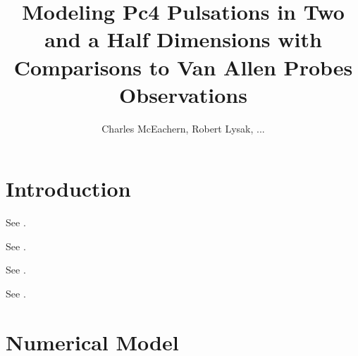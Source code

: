\documentclass[jgrga]{agutex}
\begin{document}
\title{Modeling Pc4 Pulsations in Two and a Half Dimensions with
       Comparisons to Van Allen Probes Observations}
\author{Charles McEachern, Robert Lysak, ...}


\linespread{2}


\begin{abstract}

\lipsum[1]

\end{abstract}

\begin{article}


\section{Introduction}

See \cite{dai_2015}. 

See \cite{lysak_2004}. 

See \cite{lysak_2013}. 

See \cite{motoba_2015}. 

\lipsum[2-4]


\section{Numerical Model}

\lipsum[5-6]


\end{article}
\end{document}

